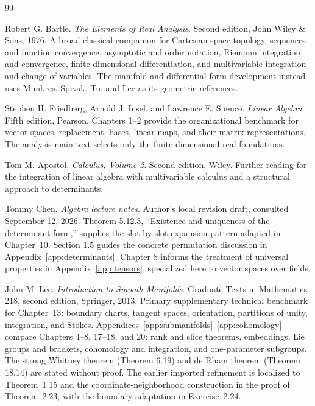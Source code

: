 \renewcommand{\bibname}{References and Further Reading}
\begin{thebibliography}{99}

Robert G. Bartle. \emph{The Elements of Real Analysis}.
Second edition, John Wiley \& Sons, 1976.
\newblock A broad classical companion for Cartesian-space topology,
sequences and function convergence, asymptotic and order notation,
Riemann integration and convergence, finite-dimensional differentiation,
and multivariable integration and change of variables. The manifold and
differential-form development instead uses Munkres, Spivak, Tu, and Lee
as its geometric references.

Stephen H. Friedberg, Arnold J. Insel, and Lawrence E. Spence.
\emph{Linear Algebra}. Fifth edition, Pearson.
\newblock Chapters 1--2 provide the organizational benchmark for vector
spaces, replacement, bases, linear maps, and their matrix representations.
The analysis main text selects only the finite-dimensional real foundations.

Tom M. Apostol. \emph{Calculus, Volume 2}. Second edition, Wiley.
\newblock Further reading for the integration of linear algebra with
multivariable calculus and a structural approach to determinants.

Tommy Chen. \emph{Algebra lecture notes}. Author's local revision draft,
consulted September 12, 2026.
\newblock Theorem 5.12.3, ``Existence and uniqueness of the determinant
form,'' supplies the slot-by-slot expansion pattern adapted in Chapter~10.
Section 1.5 guides the concrete permutation discussion in Appendix~\ref{app:determinants}.
Chapter 8 informs the treatment of universal properties in Appendix~\ref{app:tensors},
specialized here to vector spaces over fields.

John M. Lee.
\newblock \emph{Introduction to Smooth Manifolds}.
\newblock Graduate Texts in Mathematics 218, second edition, Springer, 2013.
\newblock Primary supplementary technical benchmark for Chapter~13: boundary
charts, tangent spaces, orientation, partitions of unity, integration, and
Stokes. Appendices~\ref{app:submanifolds}--\ref{app:cohomology} compare Chapters 4--8, 17--18, and 20: rank
and slice theorems, embeddings, Lie groups and brackets, cohomology and
integration, and one-parameter subgroups. The strong Whitney theorem
(Theorem 6.19) and de Rham theorem (Theorem 18.14) are stated without proof.
The earlier imported refinement is localized to Theorem~1.15 and the
coordinate-neighborhood construction in the proof of Theorem~2.23, with
the boundary adaptation in Exercise~2.24.


\end{thebibliography}
